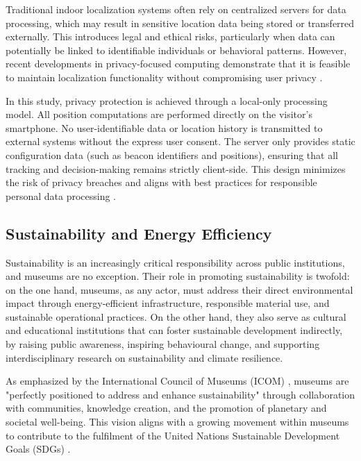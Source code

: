 Traditional indoor localization systems often rely on centralized servers for data processing, which may result in sensitive location data being stored or transferred externally. This introduces legal and ethical risks, particularly when data can potentially be linked to identifiable individuals or behavioral patterns. However, recent developments in privacy-focused computing demonstrate that it is feasible to maintain localization functionality without compromising user privacy \cite{alletto_indoor_2016, spachos_ble_2020}.

In this study, privacy protection is achieved through a local-only processing model. All position computations are performed directly on the visitor’s smartphone. No user-identifiable data or location history is transmitted to external systems without the express user consent. The server only provides static configuration data (such as beacon identifiers and positions), ensuring that all tracking and decision-making remains strictly client-side. This design minimizes the risk of privacy breaches and aligns with best practices for responsible personal data processing \cite{cnil-recomendation-mobile}.

\subsection{Sustainability and Energy Efficiency}

Sustainability is an increasingly critical responsibility across public institutions, and museums are no exception. Their role in promoting sustainability is twofold: on the one hand, museums, as any actor, must address their direct environmental impact through energy-efficient infrastructure, responsible material use, and sustainable operational practices. On the other hand, they also serve as cultural and educational institutions that can foster sustainable development indirectly, by raising public awareness, inspiring behavioural change, and supporting interdisciplinary research on sustainability and climate resilience.

As emphasized by the International Council of Museums (ICOM) \cite{icom_sustainability}, museums are "perfectly positioned to address and enhance sustainability" through collaboration with communities, knowledge creation, and the promotion of planetary and societal well-being. This vision aligns with a growing movement within museums to contribute to the fulfilment of the United Nations Sustainable Development Goals (SDGs) \cite{onofri_life_2024, rodriguez_contribution_2024}.

